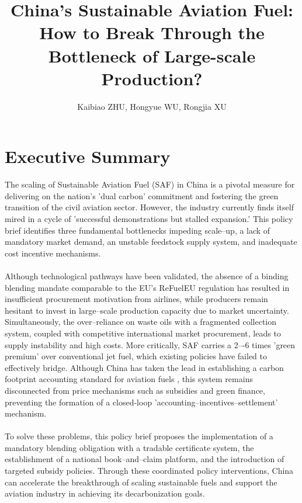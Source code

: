 \documentclass[a4paper,11pt]{article}
\title{\color{schoolblue}\textbf{China's Sustainable Aviation Fuel: How to Break Through the Bottleneck of Large-scale Production?}}
\author{Kaibiao ZHU, Hongyue WU, Rongjia XU}
\date{}
\begin{document}
\maketitle

\section*{Executive Summary}
\begin{tcolorbox}[summarystyle]

The scaling of Sustainable Aviation Fuel (SAF) in China is a pivotal measure for delivering on the nation's 'dual carbon' commitment and fostering the green transition of the civil aviation sector. However, the industry currently finds itself mired in a cycle of 'successful demonstrations but stalled expansion.' This policy brief identifies three fundamental bottlenecks impeding scale--up, a lack of mandatory market demand, an unstable feedstock supply system, and inadequate cost incentive mechanisms.\\
\\
Although technological pathways have been validated, the absence of a binding blending mandate comparable to the EU's ReFuelEU regulation has resulted in insufficient procurement motivation from airlines, while producers remain hesitant to invest in large--scale production capacity due to market uncertainty. Simultaneously, the over--reliance on waste oils with a fragmented collection system, coupled with competitive international market procurement, leads to supply instability and high costs. More critically, SAF carries a 2–-6 times 'green premium' over conventional jet fuel, which existing policies have failed to effectively bridge. Although China has taken the lead in establishing a carbon footprint accounting standard for aviation fuels \cite{caac2025}, this system remains disconnected from price mechanisms such as subsidies and green finance, preventing the formation of a closed-loop 'accounting--incentives--settlement' mechanism.\\
\\
To solve these problems, this policy brief proposes the implementation of a mandatory blending obligation with a tradable certificate system, the establishment of a national book--and--claim platform, and the introduction of targeted subsidy policies. Through these coordinated policy interventions, China can accelerate the breakthrough of scaling sustainable fuels and support the aviation industry in achieving its decarbonization goals.
\end{tcolorbox}
\end{document}
